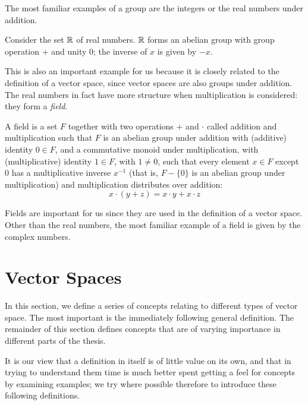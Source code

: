 \documentclass[12pt]{report}
\begin{document}
 The most familiar examples of a group are the integers or the real numbers under addition.
 \begin{example}
 Consider the set $\mathbb{R}$ of real numbers. $\mathbb{R}$ forms an abelian group with group operation $+$ and unity $0$; the inverse of $x$ is given by $-x$.
 \end{example}
 This is also an important example for us because it is closely related to the definition of a vector space, since vector spaces are also groups under addition. The real numbers in fact have more structure when multiplication is considered: they form a \emph{field}.
 \begin{defn}[Field]
 A field is a set $F$ together with two operations $+$ and $\cdot$ called addition and multiplication such that $F$ is an abelian group under addition with (additive) identity $0 \in F$, and a commutative monoid under multiplication, with (multiplicative) identity $1 \in F$, with $1 \neq 0$, such that every element $x \in F$ except $0$ has a multiplicative inverse $x^{-1}$ (that is, $F - \{0\}$ is an abelian group under multiplication) and multiplication distributes over addition:
$$x\cdot(y + z) = x\cdot y + x \cdot z$$
\end{defn}
Fields are important for us since they are used in the definition of a vector space. Other than the real numbers, the most familiar example of a field is given by the complex numbers.
 
\section{Vector Spaces}
\label{vectors}

In this section, we define a series of concepts relating to different types of vector space. The most important is the immediately following general definition. The remainder of this section defines concepts that are of varying importance in different parts of the thesis.

It is our view that a definition in itself is of little value on its own, and that in trying to understand them time is much better spent getting a feel for concepts by examining examples; we try where possible therefore to introduce these following definitions.
\end{document}
